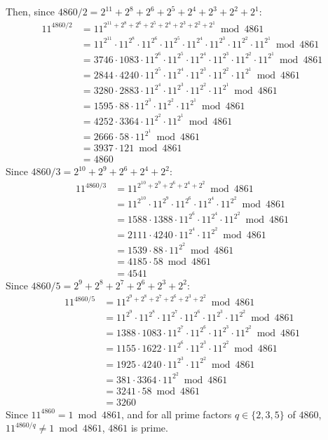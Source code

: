 \documentclass{article}
\begin{document}
Then, since $4860/2 = 2^{11} + 2^8 + 2^6 + 2^5 + 2^4 + 2^3 + 2^2 + 2^1$:
\begin{align*}
    11^{4860/2} & = 11^{2^{11} + 2^8 + 2^6 + 2^5 + 2^4 + 2^3 + 2^2 + 2^1} \bmod 4861 \\
    & = 11^{2^{11}} \cdot 11^{2^8} \cdot 11^{2^6} \cdot 11^{2^5} \cdot 11^{2^4} \cdot 11^{2^3} \cdot 11^{2^2} \cdot 11^{2^1} \bmod 4861 \\
    & = 3746 \cdot 1083 \cdot 11^{2^6} \cdot 11^{2^5} \cdot 11^{2^4} \cdot 11^{2^3} \cdot 11^{2^2} \cdot 11^{2^1} \bmod 4861 \\
    & = 2844 \cdot 4240 \cdot 11^{2^5} \cdot 11^{2^4} \cdot 11^{2^3} \cdot 11^{2^2} \cdot 11^{2^1} \bmod 4861 \\
    & = 3280 \cdot 2883 \cdot 11^{2^4} \cdot 11^{2^3} \cdot 11^{2^2} \cdot 11^{2^1} \bmod 4861 \\
    & = 1595 \cdot 88 \cdot 11^{2^3} \cdot 11^{2^2} \cdot 11^{2^1} \bmod 4861 \\
    & = 4252 \cdot 3364 \cdot 11^{2^2} \cdot 11^{2^1} \bmod 4861 \\
    & = 2666 \cdot 58 \cdot 11^{2^1} \bmod 4861 \\
    & = 3937 \cdot 121 \bmod 4861 \\
    & = 4860
\end{align*}
Since $4860/3 = 2^{10} + 2^9 + 2^6 + 2^4 + 2^2$:
\begin{align*}
    11^{4860/3} & = 11^{2^{10} + 2^9 + 2^6 + 2^4 + 2^2} \bmod 4861 \\
    & = 11^{2^{10}} \cdot 11^{2^9} \cdot 11^{2^6} \cdot 11^{2^4} \cdot 11^{2^2} \bmod 4861 \\
    & = 1588 \cdot 1388 \cdot 11^{2^6} \cdot 11^{2^4} \cdot 11^{2^2} \bmod 4861 \\
    & = 2111 \cdot 4240 \cdot 11^{2^4} \cdot 11^{2^2} \bmod 4861 \\
    & = 1539 \cdot 88 \cdot 11^{2^2} \bmod 4861 \\
    & = 4185 \cdot 58 \bmod 4861 \\
    & = 4541
\end{align*}
Since $4860/5 = 2^9 + 2^8 + 2^7 + 2^6 + 2^3 + 2^2$:
\begin{align*}
    11^{4860/5} & = 11^{2^9 + 2^8 + 2^7 + 2^6 + 2^3 + 2^2} \bmod 4861 \\
    & = 11^{2^9} \cdot 11^{2^8} \cdot 11^{2^7} \cdot 11^{2^6} \cdot 11^{2^3} \cdot 11^{2^2} \bmod 4861 \\
    & = 1388 \cdot 1083 \cdot 11^{2^7} \cdot 11^{2^6} \cdot 11^{2^3} \cdot 11^{2^2} \bmod 4861 \\
    & = 1155 \cdot 1622 \cdot 11^{2^6} \cdot 11^{2^3} \cdot 11^{2^2} \bmod 4861 \\
    & = 1925 \cdot 4240 \cdot 11^{2^3} \cdot 11^{2^2} \bmod 4861 \\
    & = 381 \cdot 3364 \cdot 11^{2^2} \bmod 4861 \\
    & = 3241 \cdot 58 \bmod 4861 \\
    & = 3260
\end{align*}
Since $11^{4860} = 1 \bmod 4861$, and for all prime factors $q \in \{2, 3, 5\}$ of $4860$, $11^{4860/q} \neq 1 \bmod 4861$, $4861$ is prime.
\end{document}
